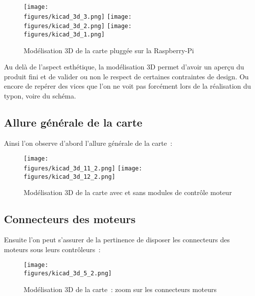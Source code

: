 \begin{figure}[H]
    \centering
    \texttt{[image: \\figures/kicad\_3d\_3.png]}
    \texttt{[image: \\figures/kicad\_3d\_2.png]}
    \texttt{[image: \\figures/kicad\_3d\_1.png]}
    \decoRule
    \caption[
    Modélisation 3D de la carte pluggée sur la Raspberry-Pi]{
    Modélisation 3D de la carte pluggée sur la Raspberry-Pi}
    \label{fig:Modélisation 3D de la carte pluggée sur la Raspberry-Pi}
    \end{figure}

\vspace{1cm}

Au delà de l'aspect esthétique, la modélisation 3D permet d'avoir un aperçu du produit fini et de valider ou non le respect de certaines contraintes de design. Ou encore de repérer des vices que l'on ne voit pas forcément lors de la réalisation du typon, voire du schéma.

\subsection{Allure générale de la carte}

Ainsi l'on observe d'abord l'allure générale de la carte~:

\begin{figure}[H]
    \centering
    \texttt{[image: \\figures/kicad\_3d\_11\_2.png]}
    \texttt{[image: \\figures/kicad\_3d\_12\_2.png]}
    \decoRule
    \caption[
    Modélisation 3D de la carte avec et sans modules de contrôle moteur]{
    Modélisation 3D de la carte avec et sans modules de contrôle moteur}
    \label{fig:Modélisation 3D de la carte avec et sans modules de contrôle moteur}
    \end{figure}

\subsection{Connecteurs des moteurs}

Ensuite l'on peut s'assurer de la pertinence de disposer les connecteurs des moteurs sous leurs contrôleurs~:

\begin{figure}[H]
    \centering
    \texttt{[image: \\figures/kicad\_3d\_5\_2.png]}
    \decoRule
    \caption[
    Modélisation 3D de la carte~: zoom sur les connecteurs moteurs]{
    Modélisation 3D de la carte~: zoom sur les connecteurs moteurs}
    \label{fig:Modélisation 3D de la carte : zoom sur les connecteurs moteurs}
    \end{figure}

